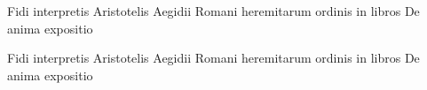 \documentclass{article}
\begin{document}
\beginnumbering
{}
Fidi interpretis Aristotelis Aegidii Romani heremitarum ordinis in libros De
anima expositio
\pend

\pstart
Fidi interpretis Aristotelis Aegidii Romani heremitarum ordinis in libros De
anima expositio
\pend

\endnumbering
\end{document}
